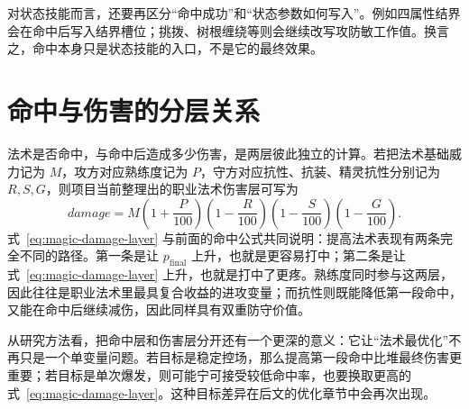 对状态技能而言，还要再区分“命中成功”和“状态参数如何写入”。例如四属性结界会在命中后写入结界槽位；挑拨、树根缠绕等则会继续改写攻防敏工作值。换言之，命中本身只是状态技能的入口，不是它的最终效果。

\section{命中与伤害的分层关系}

法术是否命中，与命中后造成多少伤害，是两层彼此独立的计算。若把法术基础威力记为 $M$，攻方对应熟练度记为 $P$，守方对应抗性、抗装、精灵抗性分别记为 $R,S,G$，则项目当前整理出的职业法术伤害层可写为
\begin{equation}
    damage = M\left(1+\frac{P}{100}\right)\left(1-\frac{R}{100}\right)\left(1-\frac{S}{100}\right)\left(1-\frac{G}{100}\right).
    \label{eq:magic-damage-layer}
\end{equation}
式~\eqref{eq:magic-damage-layer} 与前面的命中公式共同说明：提高法术表现有两条完全不同的路径。第一条是让 $p_{\mathrm{final}}$ 上升，也就是更容易打中；第二条是让式~\eqref{eq:magic-damage-layer} 上升，也就是打中了更疼。熟练度同时参与这两层，因此往往是职业法术里最具复合收益的进攻变量；而抗性则既能降低第一段命中，又能在命中后继续减伤，因此同样具有双重防守价值。

从研究方法看，把命中层和伤害层分开还有一个更深的意义：它让“法术最优化”不再只是一个单变量问题。若目标是稳定控场，那么提高第一段命中比堆最终伤害更重要；若目标是单次爆发，则可能宁可接受较低命中率，也要换取更高的式~\eqref{eq:magic-damage-layer}。这种目标差异在后文的优化章节中会再次出现。


